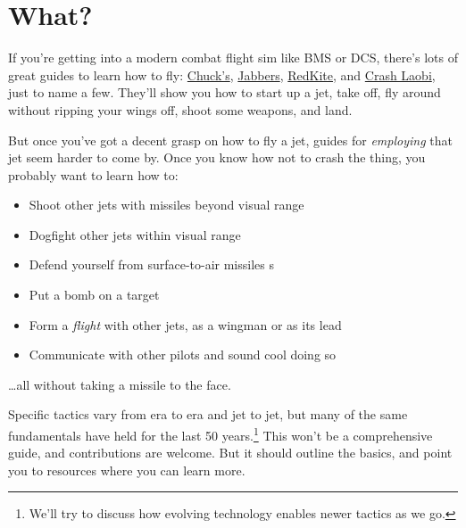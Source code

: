 \chapter{What?}

If you're getting into a modern combat flight sim like BMS or DCS,
there's lots of great guides to learn how to fly:
\href{https://www.mudspike.com/chucks-guides/}{Chuck's},
\href{https://www.youtube.com/channel/UCvXXUrGCF3wV3bbZ6pFQ00g}{Jabbers},
\href{https://www.youtube.com/user/RedKiteRender}{RedKite},
and
\href{https://www.youtube.com/channel/UCqH078Ef0HENo01LF3xwIvA}{Crash Laobi},
just to name a few.
They'll show you how to start up a jet, take off, fly around
without ripping your wings off, shoot some weapons, and land.

But once you've got a decent grasp on how to fly a jet,
guides for \emph{employing} that jet seem harder to come by.
Once you know how not to crash the thing, you probably want to learn how to:
\begin{itemize}
\item Shoot other jets with missiles beyond visual range 
\item Dogfight other jets within visual range 
\item Defend yourself from surface-to-air missiles s
\item Put a bomb on a target
\item Form a \emph{flight} with other jets, as a wingman or as its lead
\item Communicate with other pilots and sound cool doing so
\end{itemize}
\dots all without taking a missile to the face.

Specific tactics vary from era to era and jet to jet,
but many of the same fundamentals have held for the last 50
years.\punckern\footnote{We'll try to discuss how evolving technology
enables newer tactics as we go.}
This won't be a comprehensive guide,
and contributions are welcome.
But it should outline the basics, and point you to resources where you can
learn more.
